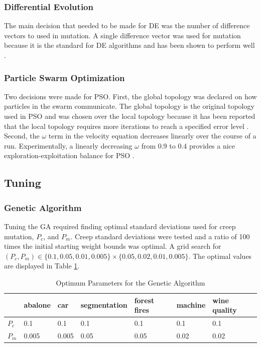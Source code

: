 \documentclass[twoside,11pt]{article}
\begin{document}
\subsubsection{Differential Evolution}
	The main decision that needed to be made for DE was the number of difference vectors to used in mutation. A single difference vector was used for mutation because it is the standard for DE algorithms and has been shown to perform well \cite{gamperle2002parameter}. 

\subsubsection{Particle Swarm Optimization}

	
	Two decisions were made for PSO. First, the global topology was declared on how particles in the swarm communicate. 
	The global topology is the original topology used in PSO and was chosen over the local topology because it has been reported that the local topology requires more iterations to reach a specified error level \citep{og-pso}. 
	Second, the $\omega$ term in the velocity equation decreases linearly over the course of a run. Experimentally, a linearly decreasing $\omega$ from 0.9 to 0.4 provides a nice exploration-exploitation balance for PSO \citep{inertia}.

\subsection{Tuning}

\subsubsection{Genetic Algorithm}

	Tuning the GA required finding optimal standard deviations used for creep mutation, $P_c$, and $P_m$. Creep standard deviations were tested and a ratio of 100 times the initial starting weight bounds was optimal. A grid search for $(P_c, P_m) \in \{0.1, 0.05, 0.01, 0.005\} \times \{0.05, 0.02, 0.01, 0.005\}$. The optimal values are displayed in Table \ref{ga-tuning-table}. 

	\begin{table}[h]
		\centering
		\begin{tabular}{|l|l|l|l|l|l|l|}
			\hline
			       & abalone & car & segmentation & forest fires & machine & wine quality  \\ \hline
			$P_c$  &     0.1 & 0.1 &          0.1 &          0.1 &     0.1 &          0.1  \\ \hline
			$P_m$  &   0.005 & 0.005 &       0.05 &         0.05 &    0.02 &         0.02  \\ \hline
		\end{tabular}
		\caption{Optimum Parameters for the Genetic Algorithm}
		\label{ga-tuning-table}
	\end{table}
\end{document}
